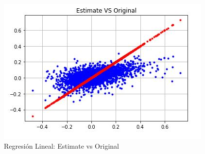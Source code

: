 \begin{figure}[h!]
	\centering
	\includegraphics[width=0.8\linewidth]{Figure/RegresionLineal_Results.JPG}
	\caption{Regresi\'on Lineal: Estimate vs Original} 
	\label{fig:LinearRegresionKernel_Results}
\end{figure}
\\
\\
\newpage
